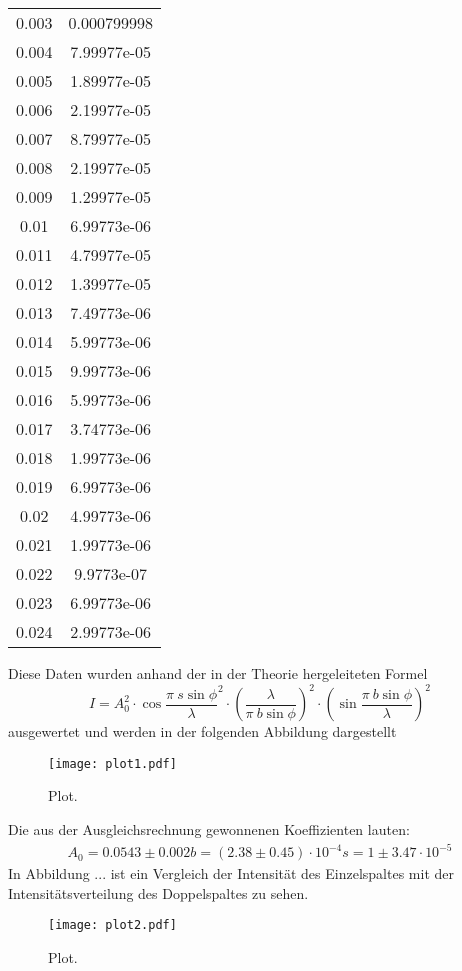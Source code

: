 \begin{table}[H]
\begin{tabular}{c c}
  0.003       & 0.000799998 \\
  0.004       & 7.99977e-05 \\
  0.005       & 1.89977e-05 \\
  0.006       & 2.19977e-05 \\
  0.007       & 8.79977e-05 \\
  0.008       & 2.19977e-05 \\
  0.009       & 1.29977e-05 \\
  0.01        & 6.99773e-06 \\
  0.011       & 4.79977e-05 \\
  0.012       & 1.39977e-05 \\
  0.013       & 7.49773e-06 \\
  0.014       & 5.99773e-06 \\
  0.015       & 9.99773e-06 \\
  0.016       & 5.99773e-06 \\
  0.017       & 3.74773e-06 \\
  0.018       & 1.99773e-06 \\
  0.019       & 6.99773e-06 \\
  0.02        & 4.99773e-06 \\
  0.021       & 1.99773e-06 \\
  0.022       & 9.9773e-07  \\
  0.023       & 6.99773e-06 \\
  0.024       & 2.99773e-06 \\
  \bottomrule
  \end{tabular}
  \end{table}
  Diese Daten wurden anhand der in der Theorie hergeleiteten Formel 
  \begin{equation*}
    I= A_0^2\cdot \cos{\dfrac{\pi\ s \sin{\phi}}{\lambda}}^2 \cdot
    (\dfrac{\lambda}{\pi \ b \sin{\phi}})^2 \cdot (\sin{\dfrac{\pi\ b \sin{\phi}}{\lambda}})^2
  \end{equation*}
  ausgewertet und werden in der folgenden Abbildung dargestellt
  \begin{figure}
    \centering
    \texttt{[image: plot1.pdf]}
    \caption{Plot.}
    \label{fig:plot}
  \end{figure}
  Die aus der Ausgleichsrechnung gewonnenen Koeffizienten lauten:
  \begin{align*}
    A_0 = 0.0543 \pm 0.002
    b = (2.38 \pm 0.45)\cdot 10^{-4}
    s = 1 \pm 3.47 \cdot 10^{-5}
  \end{align*}
  In Abbildung ... ist ein Vergleich der Intensität des Einzelspaltes mit der 
  Intensitätsverteilung des Doppelspaltes zu sehen.
  \begin{figure}
    \centering
    \texttt{[image: plot2.pdf]}
    \caption{Plot.}
    \label{fig:plot}
  \end{figure}